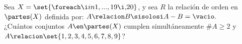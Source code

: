 \ejercicio

Sea $X = \set{\foreach \i in {1,...,19}{\i,}20}$, y sea $R$ la relación de orden en $\partes(X)$ definida por:
$A \relacion B \sisolosi A - B = \vacio.$\\
¿Cuántos conjuntos $A \en \partes(X)$ cumplen simultáneamente $\#A \geq 2$ y $A \relacion \set{1,2,3,4,5,6,7,8,9}$?

\separadorCorto

\Hacer
